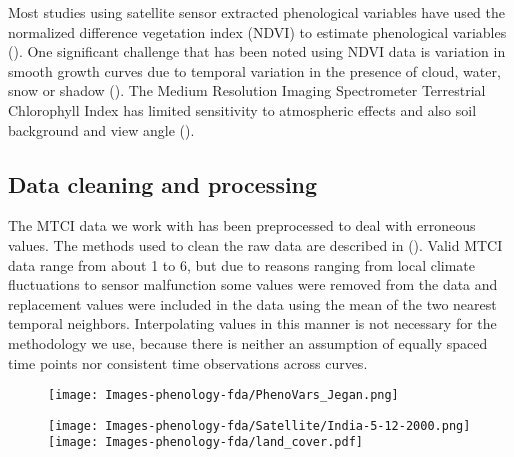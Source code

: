  Most studies using satellite sensor extracted phenological variables have used the normalized difference vegetation index (NDVI) to estimate phenological variables (\cite{Jeyaseelan:2007dh,Saikia:2009cm}). One significant challenge that has been noted using NDVI data is variation in smooth growth curves due to temporal variation in the presence of cloud, water, snow or shadow (\cite{Goward:1985hr,Huete:2002gy}). The Medium Resolution Imaging Spectrometer Terrestrial Chlorophyll Index has limited sensitivity to atmospheric effects and also soil background and view angle (\cite{Dash:2010kva}). 

\subsection{Data cleaning and processing} %
\label{sub:data_cleaning_and_processing}

The MTCI data we work with has been preprocessed to deal with erroneous values. The methods used to clean the raw data are described in (\cite{Dash:2010kva}). Valid MTCI data range from about 1 to 6, but due to reasons ranging from local climate fluctuations to sensor malfunction some values were removed from the data and replacement values were included in the data using the mean of the two nearest temporal neighbors. Interpolating values in this manner is not necessary for the methodology we use, because there is neither an assumption of equally spaced time points nor consistent time observations across curves.


\begin{figure}
	[htbp] \centering 
	\texttt{[image: Images-phenology-fda/PhenoVars\_Jegan.png]}  \label{fig:phenology diagram} 
\end{figure}



\begin{figure}
	[htbp] 
	\hspace{1.5cm}\texttt{[image: Images-phenology-fda/Satellite/India-5-12-2000.png]}   \\
	\texttt{[image: Images-phenology-fda/land\_cover.pdf]}
	  \label{fig:land cover} 
\end{figure}

